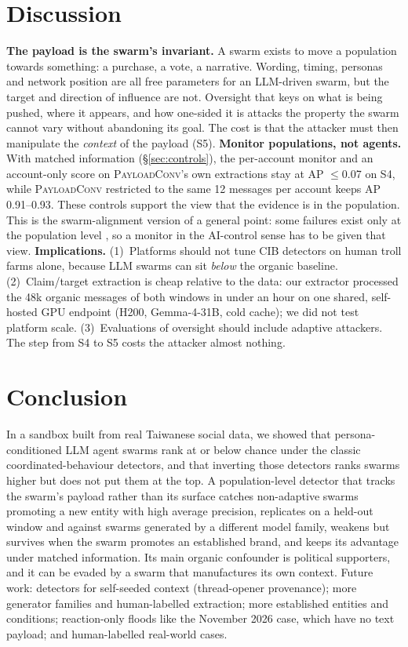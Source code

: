 \documentclass[10pt]{article}
\newcommand{\ours}{\textsc{PayloadConv}}
\begin{document}
\section{Discussion}
\textbf{The payload is the swarm's invariant.} A swarm exists to move a population towards something: a purchase, a vote, a narrative. Wording, timing, personas and network position are all free parameters for an LLM-driven swarm, but the target and direction of influence are not. Oversight that keys on what is being pushed, where it appears, and how one-sided it is attacks the property the swarm cannot vary without abandoning its goal. The cost is that the attacker must then manipulate the \emph{context} of the payload (S5).
\textbf{Monitor populations, not agents.} With matched information (\S\ref{sec:controls}), the per-account monitor and an account-only score on \ours{}'s own extractions stay at AP $\le$0.07 on S4, while \ours{} restricted to the same 12 messages per account keeps AP 0.91--0.93. These controls support the view that the evidence is in the population. This is the swarm-alignment version of a general point: some failures exist only at the population level \citep{hammond2025multiagent}, so a monitor in the AI-control sense \citep{greenblatt2024control} has to be given that view.
\textbf{Implications.} (1)~Platforms should not tune CIB detectors on human troll farms alone, because LLM swarms can sit \emph{below} the organic baseline. (2)~Claim/target extraction is cheap relative to the data: our extractor processed the 48k organic messages of both windows in under an hour on one shared, self-hosted GPU endpoint (H200, Gemma-4-31B, cold cache); we did not test platform scale. (3)~Evaluations of oversight should include adaptive attackers. The step from S4 to S5 costs the attacker almost nothing.

\section{Conclusion}
In a sandbox built from real Taiwanese social data, we showed that persona-conditioned LLM agent swarms rank at or below chance under the classic coordinated-behaviour detectors, and that inverting those detectors ranks swarms higher but does not put them at the top. A population-level detector that tracks the swarm's payload rather than its surface catches non-adaptive swarms promoting a new entity with high average precision, replicates on a held-out window and against swarms generated by a different model family, weakens but survives when the swarm promotes an established brand, and keeps its advantage under matched information. Its main organic confounder is political supporters, and it can be evaded by a swarm that manufactures its own context.
Future work: detectors for self-seeded context (thread-opener provenance); more generator families and human-labelled extraction; more established entities and conditions; reaction-only floods like the November 2026 case, which have no text payload; and human-labelled real-world cases.
\end{document}
